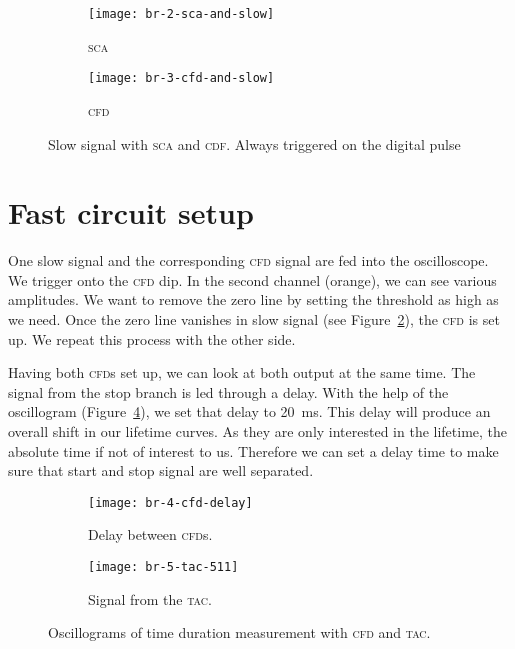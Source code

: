 \documentclass[11pt, english, fleqn, DIV=15, headinclude, BCOR=2cm]{scrreprt}
\begin{document}

\begin{figure}
    \centering
    \begin{subfigure}[c]{0.48\linewidth}
        \centering
        \texttt{[image: br-2-sca-and-slow]}
        \caption{%
            \textsc{sca}
        }
        \label{fig:2-sca-and-slow}
    \end{subfigure}
    \hfill
    \begin{subfigure}[c]{0.48\linewidth}
        \centering
        \texttt{[image: br-3-cfd-and-slow]}
        \caption{%
            \textsc{cfd}
        }
        \label{fig:3-cfd-and-slow}
    \end{subfigure}
    \caption{%
        Slow signal with \textsc{sca} and \textsc{cdf}. Always triggered on the
        digital pulse
    }
    \label{fig:}
\end{figure}

\section{Fast circuit setup}

One slow signal and the corresponding \textsc{cfd} signal are fed into the
oscilloscope. We trigger onto the \textsc{cfd} dip. In the second channel
(orange), we can see various amplitudes. We want to remove the zero line by
setting the threshold as high as we need. Once the zero line vanishes in slow
signal (see Figure~\ref{fig:3-cfd-and-slow}), the \textsc{cfd} is set up. We
repeat this process with the other side.

Having both \textsc{cfd}s set up, we can look at both output at the same time.
The signal from the stop branch is led through a delay. With the help of the
oscillogram (Figure~\ref{fig:4-cfd-delay}), we set that delay to
\SI{20}{\milli\second}. This delay will produce an overall shift in our
lifetime curves. As they are only interested in the lifetime, the absolute time
if not of interest to us. Therefore we can set a delay time to make sure that
start and stop signal are well separated.

\begin{figure}
    \centering
    \begin{subfigure}[c]{0.48\linewidth}
        \centering
        \texttt{[image: br-4-cfd-delay]}
        \caption{%
            Delay between \textsc{cfd}s.
        }
        \label{fig:4-cfd-delay}
    \end{subfigure}
    \hfill
    \begin{subfigure}[c]{0.48\linewidth}
        \centering
        \texttt{[image: br-5-tac-511]}
        \caption{%
            Signal from the \textsc{tac}.
        }
        \label{fig:5-tac-511}
    \end{subfigure}
    \caption{%
        Oscillograms of time duration measurement with \textsc{cfd} and
        \textsc{tac}.
    }
    \label{fig:}
\end{figure}
\end{document}
